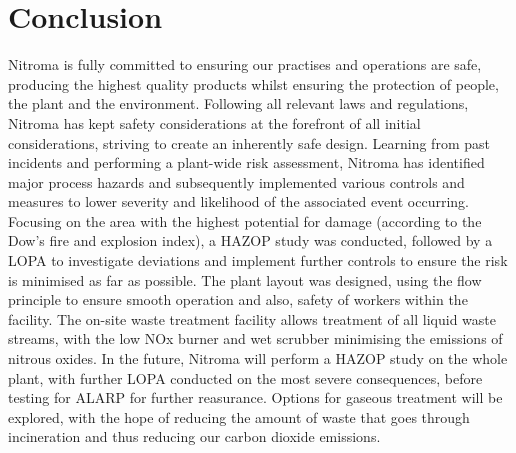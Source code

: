 \section{Conclusion}

Nitroma is fully committed to ensuring our practises and operations are safe, producing the highest quality products whilst ensuring the protection of people, the plant and the environment. Following all relevant laws and regulations, Nitroma has kept safety considerations at the forefront of all initial considerations, striving to create an inherently safe design. Learning from past incidents and performing a plant-wide risk assessment, Nitroma has identified major process hazards and subsequently implemented various controls and measures to lower severity and likelihood of the associated event occurring. Focusing on the area with the highest potential for damage (according to the Dow’s fire and explosion index), a HAZOP study was conducted, followed by a LOPA to investigate deviations and implement further controls to ensure the risk is minimised as far as possible. The plant layout was designed, using the flow principle to ensure smooth operation and also, safety of workers within the facility. The on-site waste treatment facility allows treatment of all liquid waste streams, with the low NOx burner and wet scrubber minimising the emissions of nitrous oxides. In the future, Nitroma will perform a HAZOP study on the whole plant, with further LOPA conducted on the most severe consequences, before testing for ALARP for further reasurance. Options for gaseous treatment will be explored, with the hope of reducing the amount of waste that goes through incineration and thus reducing our carbon dioxide emissions. 
